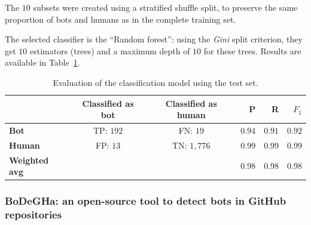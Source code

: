 \documentclass[a4paper, 12pt]{book}
\begin{document}
The $10$ subsets were created using a stratified shuffle split, to preserve the same proportion of bots and humans as in the complete training set.

The selected classifier is the ``Random forest'': using the \textit{Gini} split criterion, they get $10$ estimators (trees) and a maximum depth of $10$ for these trees. Results are available in Table~\ref{table:golzadeh-table-results}.
\smallskip


\begin{table}[htb]  %
 \renewcommand{\arraystretch}{1.2}  %
 \begin{center}
  \begin{tabular}{  l  c  c  r  r  r }
    \toprule    %
      & \textbf{Classified as bot} & \textbf{Classified as human} & \textbf{P} & \textbf{R} & \textbf{$F_{1}$} \\ 
      \midrule %
    \textbf{Bot} & TP: $192$ & FN: $19$ & $0.94$ & $0.91$ & $0.92$ \\ %
    \textbf{Human} & FP: $13$ & TN: $1,776$ & $0.99$ & $0.99$ & $0.99$ \\ %
    \textbf{Weighted avg} &  &  & $0.98$ & $0.98$ & $0.98$ \\
    \bottomrule     %
  \end{tabular}
  \caption{Evaluation of the classification model using the test set.}
  \label{table:golzadeh-table-results}
 \end{center}
\end{table}

\subsubsection{BoDeGHa: an open-source tool to detect bots in GitHub repositories}
\label{sssec:golzadeh-tool}
\end{document}
